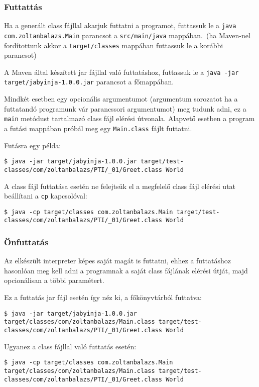 \subsubsection{Futtattás}

Ha a generált class fájllal akarjuk futtatni a programot, futtassuk le a \lstinline{java com.zoltanbalazs.Main} parancsot a \lstinline{src/main/java} mappában.\ (ha Maven-nel fordítottunk akkor a \lstinline{target/classes} mappában futtassuk le a korábbi parancsot)

A Maven által készített jar fájllal való futtatáshoz, futtassuk le a \lstinline{java -jar target/jabyinja-1.0.0.jar} parancsot a főmappában.

Mindkét esetben egy opcionális argumentumot (argumentum sorozatot ha a futtatandó programunk vár parancssori argumentumot) meg tudunk adni, ez a \lstinline{main} metódust tartalmazó class fájl elérési útvonala. Alapvető esetben a program a futási mappában próbál meg egy \lstinline{Main.class} fájlt futtatni.

Futásra egy példa:
\begin{verbatim}
$ java -jar target/jabyinja-1.0.0.jar target/test-classes/com/zoltanbalazs/PTI/_01/Greet.class World
\end{verbatim}

A class fájl futtatása esetén ne felejtsük el a megfelelő class fájl elérési utat beállítani a \lstinline{cp} kapcsolóval:
\begin{verbatim}
$ java -cp target/classes com.zoltanbalazs.Main target/test-classes/com/zoltanbalazs/PTI/_01/Greet.class World
\end{verbatim}

\subsubsection{Önfuttatás}

Az elkészült interpreter képes saját magát is futtatni, ehhez a futtatáshoz hasonlóan meg kell adni a programnak a saját class fájlának elérési útját, majd opcionálisan a többi paramétert.

Ez a futtatás jar fájl esetén így néz ki, a főkönyvtárból futtatva:
\begin{verbatim}
$ java -jar target/jabyinja-1.0.0.jar target/classes/com/zoltanbalazs/Main.class target/test-classes/com/zoltanbalazs/PTI/_01/Greet.class World
\end{verbatim}

Ugyanez a class fájllal való futtatás esetén:
\begin{verbatim}
$ java -cp target/classes com.zoltanbalazs.Main target/classes/com/zoltanbalazs/Main.class target/test-classes/com/zoltanbalazs/PTI/_01/Greet.class World
\end{verbatim}

